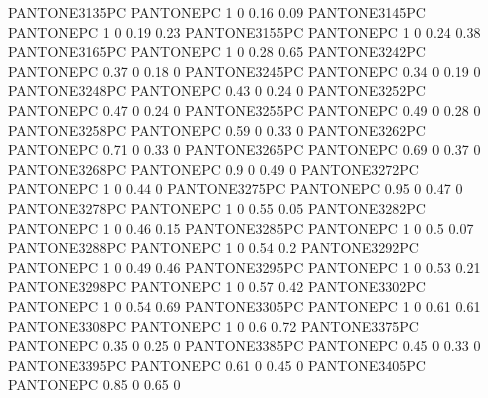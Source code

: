  {PANTONE3135PC} {PANTONE\SpotSpace PC} {1 0 0.16 0.09}
 {PANTONE3145PC} {PANTONE\SpotSpace PC} {1 0 0.19 0.23}
 {PANTONE3155PC} {PANTONE\SpotSpace PC} {1 0 0.24 0.38}
 {PANTONE3165PC} {PANTONE\SpotSpace PC} {1 0 0.28 0.65}
 {PANTONE3242PC} {PANTONE\SpotSpace PC} {0.37 0 0.18 0}
 {PANTONE3245PC} {PANTONE\SpotSpace PC} {0.34 0 0.19 0}
 {PANTONE3248PC} {PANTONE\SpotSpace PC} {0.43 0 0.24 0}
 {PANTONE3252PC} {PANTONE\SpotSpace PC} {0.47 0 0.24 0}
 {PANTONE3255PC} {PANTONE\SpotSpace PC} {0.49 0 0.28 0}
 {PANTONE3258PC} {PANTONE\SpotSpace PC} {0.59 0 0.33 0}
 {PANTONE3262PC} {PANTONE\SpotSpace PC} {0.71 0 0.33 0}
 {PANTONE3265PC} {PANTONE\SpotSpace PC} {0.69 0 0.37 0}
 {PANTONE3268PC} {PANTONE\SpotSpace PC} {0.9 0 0.49 0}
 {PANTONE3272PC} {PANTONE\SpotSpace PC} {1 0 0.44 0}
 {PANTONE3275PC} {PANTONE\SpotSpace PC} {0.95 0 0.47 0}
 {PANTONE3278PC} {PANTONE\SpotSpace PC} {1 0 0.55 0.05}
 {PANTONE3282PC} {PANTONE\SpotSpace PC} {1 0 0.46 0.15}
 {PANTONE3285PC} {PANTONE\SpotSpace PC} {1 0 0.5 0.07}
 {PANTONE3288PC} {PANTONE\SpotSpace PC} {1 0 0.54 0.2}
 {PANTONE3292PC} {PANTONE\SpotSpace PC} {1 0 0.49 0.46}
 {PANTONE3295PC} {PANTONE\SpotSpace PC} {1 0 0.53 0.21}
 {PANTONE3298PC} {PANTONE\SpotSpace PC} {1 0 0.57 0.42}
 {PANTONE3302PC} {PANTONE\SpotSpace PC} {1 0 0.54 0.69}
 {PANTONE3305PC} {PANTONE\SpotSpace PC} {1 0 0.61 0.61}
 {PANTONE3308PC} {PANTONE\SpotSpace PC} {1 0 0.6 0.72}
 {PANTONE3375PC} {PANTONE\SpotSpace PC} {0.35 0 0.25 0}
 {PANTONE3385PC} {PANTONE\SpotSpace PC} {0.45 0 0.33 0}
 {PANTONE3395PC} {PANTONE\SpotSpace PC} {0.61 0 0.45 0}
 {PANTONE3405PC} {PANTONE\SpotSpace PC} {0.85 0 0.65 0}
